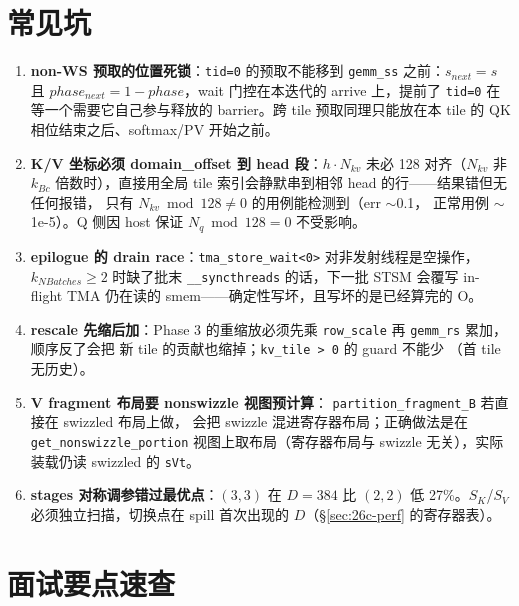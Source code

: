 \section{常见坑}\label{sec:26c-pitfalls}

\begin{enumerate}[itemsep=2pt]
  \item \textbf{non-WS 预取的位置死锁}：\texttt{tid=0} 的预取不能移到
        \texttt{gemm\_ss} 之前：$s_{next} = s$ 且 $phase_{next} =
        1{-}phase$，wait 门控在本迭代的 arrive 上，提前了
        \texttt{tid=0} 在等一个需要它自己参与释放的 barrier。跨 tile
        预取同理只能放在本 tile 的 QK 相位结束之后、softmax/PV
        开始之前。
  \item \textbf{K/V 坐标必须 domain\_offset 到 head 段}：$h\cdot N_{kv}$
        未必 128 对齐（$N_{kv}$ 非 $k_{Bc}$ 倍数时），直接用全局
        tile 索引会静默串到相邻 head 的行——结果错但无任何报错，
        只有 $N_{kv} \bmod 128 \ne 0$ 的用例能检测到（err $\sim$0.1，
        正常用例 $\sim$1e-5）。Q 侧因 host 保证 $N_q \bmod 128 = 0$
        不受影响。
  \item \textbf{epilogue 的 drain race}：\texttt{tma\_store\_wait<0>}
        对非发射线程是空操作，$k_{NBatches}\ge2$ 时缺了批末
        \texttt{\_\_syncthreads} 的话，下一批 STSM 会覆写 in-flight
        TMA 仍在读的 smem——确定性写坏，且写坏的是已经算完的 O。
  \item \textbf{rescale 先缩后加}：Phase 3 的重缩放必须先乘
        \texttt{row\_scale} 再 \texttt{gemm\_rs} 累加，顺序反了会把
        新 tile 的贡献也缩掉；\texttt{kv\_tile > 0} 的 guard 不能少
        （首 tile 无历史）。
  \item \textbf{V fragment 布局要 nonswizzle 视图预计算}：
        \texttt{partition\_fragment\_B} 若直接在 swizzled 布局上做，
        会把 swizzle 混进寄存器布局；正确做法是在
        \texttt{get\_nonswizzle\_portion} 视图上取布局（寄存器布局与
        swizzle 无关），实际装载仍读 swizzled 的 \texttt{sVt}。
  \item \textbf{stages 对称调参错过最优点}：$(3,3)$ 在 $D{=}384$ 比
        $(2,2)$ 低 27\%。$S_K$/$S_V$ 必须独立扫描，切换点在 spill
        首次出现的 $D$（\S\ref{sec:26c-perf} 的寄存器表）。
\end{enumerate}

\section{面试要点速查}\label{sec:26c-interview}

